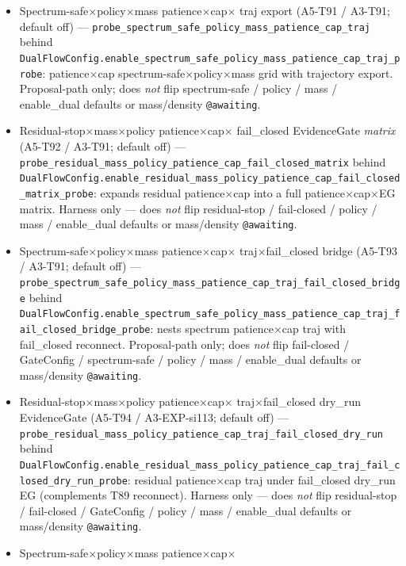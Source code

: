 \documentclass[11pt]{article}
\begin{document}
\begin{itemize}[leftmargin=1.5em]
  enable\_dual defaults or mass/density \texttt{@awaiting}.
  \item Spectrum-safe$\times$policy$\times$mass patience$\times$cap$\times$
  traj export (A5-T91 / A3-T91; default off) ---
  \texttt{probe\_spectrum\_safe\_policy\_mass\_patience\_cap\_traj} behind
  \texttt{DualFlowConfig.enable\_spectrum\_safe\_policy\_mass\_patience\_cap\_traj\_probe}:
  patience$\times$cap spectrum-safe$\times$policy$\times$mass grid with
  trajectory export. Proposal-path only; does \emph{not} flip
  spectrum-safe / policy / mass / enable\_dual defaults or mass/density
  \texttt{@awaiting}.
  \item Residual-stop$\times$mass$\times$policy patience$\times$cap$\times$
  fail\_closed EvidenceGate \emph{matrix} (A5-T92 / A3-T91; default off)
  ---
  \texttt{probe\_residual\_mass\_policy\_patience\_cap\_fail\_closed\_matrix}
  behind
  \texttt{DualFlowConfig.enable\_residual\_mass\_policy\_patience\_cap\_fail\_closed\_matrix\_probe}:
  expands residual patience$\times$cap into a full
  patience$\times$cap$\times$EG matrix. Harness only --- does \emph{not}
  flip residual-stop / fail-closed / policy / mass / enable\_dual
  defaults or mass/density \texttt{@awaiting}.
  \item Spectrum-safe$\times$policy$\times$mass patience$\times$cap$\times$
  traj$\times$fail\_closed bridge (A5-T93 / A3-T91; default off) ---
  \texttt{probe\_spectrum\_safe\_policy\_mass\_patience\_cap\_traj\_fail\_closed\_bridge}
  behind
  \texttt{DualFlowConfig.enable\_spectrum\_safe\_policy\_mass\_patience\_cap\_traj\_fail\_closed\_bridge\_probe}:
  nests spectrum patience$\times$cap traj with fail\_closed reconnect.
  Proposal-path only; does \emph{not} flip fail-closed / GateConfig /
  spectrum-safe / policy / mass / enable\_dual defaults or mass/density
  \texttt{@awaiting}.
  \item Residual-stop$\times$mass$\times$policy patience$\times$cap$\times$
  traj$\times$fail\_closed dry\_run EvidenceGate (A5-T94 / A3-EXP-si113;
  default off) ---
  \texttt{probe\_residual\_mass\_policy\_patience\_cap\_traj\_fail\_closed\_dry\_run}
  behind
  \texttt{DualFlowConfig.enable\_residual\_mass\_policy\_patience\_cap\_traj\_fail\_closed\_dry\_run\_probe}:
  residual patience$\times$cap traj under fail\_closed dry\_run EG
  (complements T89 reconnect). Harness only --- does \emph{not} flip
  residual-stop / fail-closed / GateConfig / policy / mass /
  enable\_dual defaults or mass/density \texttt{@awaiting}.
  \item Spectrum-safe$\times$policy$\times$mass patience$\times$cap$\times$

\end{itemize}
\end{document}

